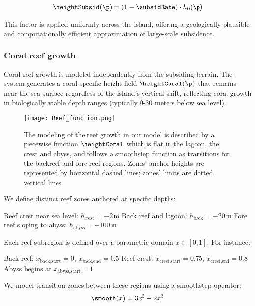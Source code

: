 \documentclass{egpubl}
\begin{document}
\begin{align}
    \heightSubsid(\p) = (1 - \subsidRate) \cdot h_0(\p)
\end{align}

This factor is applied uniformly across the island, offering a geologically plausible and computationally efficient approximation of large-scale subsidence.

\subsubsection{Coral reef growth}
\label{sec:coral-island_reef-growth}

Coral reef growth is modeled independently from the subsiding terrain. The system generates a coral-specific height field $\heightCoral(\p)$ that remains near the sea surface regardless of the island's vertical shift, reflecting coral growth in biologically viable depth ranges (typically 0-30 meters below sea level).

\begin{figure}
    \texttt{[image: Reef\_function.png]}
    \caption{The modeling of the reef growth in our model is described by a piecewise function $\heightCoral$ which is flat in the lagoon, the crest and abyss, and follows a smoothstep function as transitions for the backreef and fore reef regions. Zones' anchor heights are represented by horizontal dashed lines; zones' limits are dotted vertical lines. }
    \label{fig:coral-island_reef-function}
\end{figure}

We define distinct reef zones anchored at specific depths:
\begin{Itemize}
    \Item{} Reef crest near sea level: $h_\text{crest} = -2$\,m
    \Item{} Back reef and lagoon: $h_\text{back} = -20$\,m
    \Item{} Fore reef sloping to abyss: $h_\text{abyss} = -100$\,m
\end{Itemize}

Each reef subregion is defined over a parametric domain $x \in [0, 1]$. For instance:
\begin{Itemize}
    \Item{} Back reef: $x_{\text{back,start}} = 0$, $x_{\text{back,end}} = 0.5$
    \Item{} Reef crest: $x_{\text{crest,start}} = 0.75$, $x_{\text{crest,end}} = 0.8$
    \Item{} Abyss begins at $x_{\text{abyss,start}} = 1$
\end{Itemize}

We model transition zones between these regions using a smoothstep operator:
\begin{align}
    \smooth(x) = 3x^2 - 2x^3
\end{align}
\end{document}
